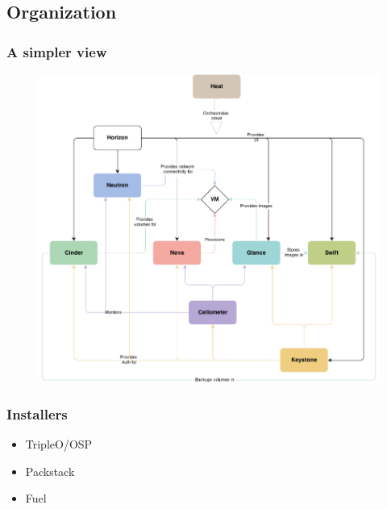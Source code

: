 \subsection{Organization} 
\begin{frame}
	\frametitle{A simpler view}
	\begin{figure}
		\includegraphics[width=0.7\linewidth]{images/diagram.png}
	\end{figure}
\end{frame}

\begin{frame}
	\frametitle{Installers}
	\begin{itemize}
		\item TripleO/OSP
		\item Packstack
		\item Fuel
	\end{itemize}
\end{frame}
